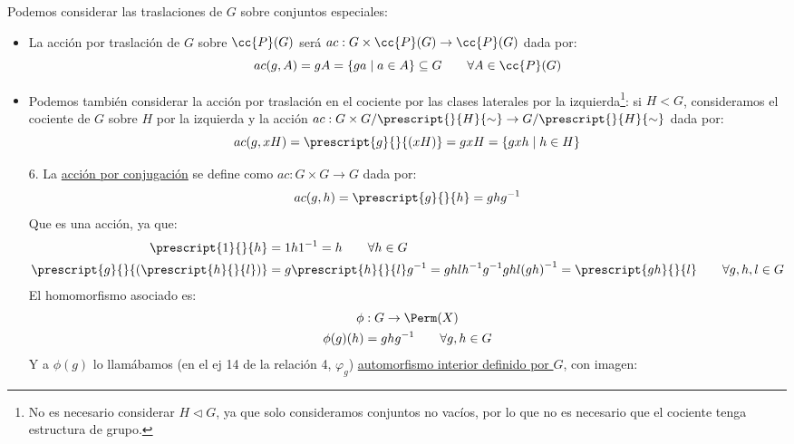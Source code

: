 \begin{ejemplo}
    Podemos considerar las traslaciones de $G$ sobre conjuntos especiales:
    \begin{itemize}
        \item La acción por traslación de $G$ sobre $\cc{P}(G)$ será $ac:G\times \cc{P}(G) \to \cc{P}(G)$ dada por:
            \begin{equation*}
                ac(g,A) = gA = \{ga \mid a\in A\}  \subseteq G \qquad \forall A\in \cc{P}(G)
            \end{equation*}
        \item Podemos también considerar la acción por traslación en el cociente por las clases laterales por la izquierda\footnote{No es necesario considerar $H\lhd G$, ya que solo consideramos conjuntos no vacíos, por lo que no es necesario que el cociente tenga estructura de grupo.}: si $H<G$, consideramos el cociente de $G$ sobre $H$ por la izquierda y la acción $ac:G\times G/\prescript{}{H}{\sim} \to G/\prescript{}{H}{\sim}$ dada por:
            \begin{equation*}
                ac(g,xH) = \prescript{g}{}{(xH)} = gxH  = \{gxh \mid h\in H\}
            \end{equation*}
    \end{itemize}
    \begin{enumerate}
        \item[6.] La \underline{acción por conjugación} se define como $ac:G\times G\to G$ dada por:
            \begin{equation*}
                ac(g,h) = \prescript{g}{}{h} = ghg^{-1}
            \end{equation*}
            Que es una acción, ya que:
            \begin{align*}
                \prescript{1}{}{h} &= 1h1^{-1} = h \qquad \forall h\in G\\
                \prescript{g}{}{(\prescript{h}{}{l})} &= g\prescript{h}{}{l}g^{-1} = ghlh^{-1}g^{-1} ghl{(gh)}^{-1} = \prescript{gh}{}{l} \qquad \forall g,h,l \in G
            \end{align*}
            El homomorfismo asociado es:
            \begin{gather*}
                \phi:G\to\Perm(X) \\
                \phi(g)(h) = ghg^{-1} \qquad \forall g,h\in G
            \end{gather*}
            Y a $\phi(g)$ lo llamábamos (en el ej 14 de la relación 4, $\varphi_g$) \newline \underline{automorfismo interior definido por $G$}, con imagen:

\end{enumerate}
\end{ejemplo}
